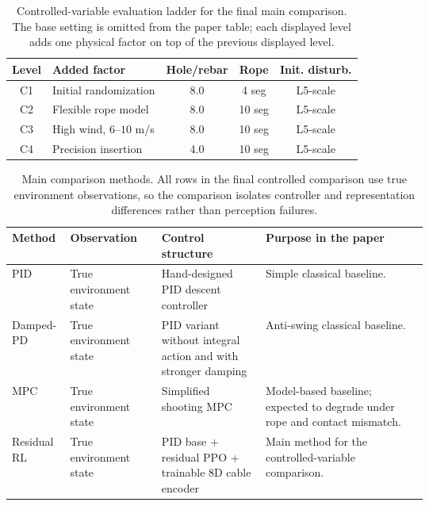 \documentclass[10pt]{article}
\begin{document}
\begin{table}[t]
\centering
\caption{Controlled-variable evaluation ladder for the final main comparison.  The base setting is omitted from the paper table; each displayed level adds one physical factor on top of the previous displayed level.}
\label{tab:controlled_ladder}
\footnotesize
\begin{tabular}{@{}clccc@{}}
\toprule
Level & Added factor & Hole/rebar & Rope & Init. disturb. \\
\midrule
C1 & Initial randomization & 8.0 & 4 seg & L5-scale \\
C2 & Flexible rope model & 8.0 & 10 seg & L5-scale \\
C3 & High wind, $6$--$10$ m/s & 8.0 & 10 seg & L5-scale \\
C4 & Precision insertion & 4.0 & 10 seg & L5-scale \\
\bottomrule
\end{tabular}
\end{table}

\begin{table}[t]
\centering
\caption{Main comparison methods.  All rows in the final controlled comparison use true environment observations, so the comparison isolates controller and representation differences rather than perception failures.}
\label{tab:main_methods}
\footnotesize
\begin{tabularx}{\linewidth}{@{}p{0.14\linewidth}p{0.22\linewidth}p{0.25\linewidth}Y@{}}
\toprule
Method & Observation & Control structure & Purpose in the paper \\
\midrule
PID & True environment state & Hand-designed PID descent controller & Simple classical baseline. \\
Damped-PD & True environment state & PID variant without integral action and with stronger damping & Anti-swing classical baseline. \\
MPC & True environment state & Simplified shooting MPC & Model-based baseline; expected to degrade under rope and contact mismatch. \\
Residual RL & True environment state & PID base + residual PPO + trainable 8D cable encoder & Main method for the controlled-variable comparison. \\
\bottomrule
\end{tabularx}
\end{table}
\end{document}
